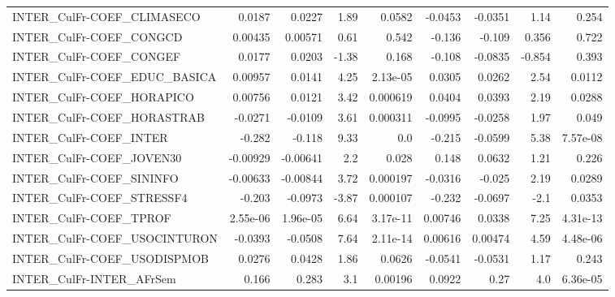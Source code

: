 \begin{tabular}{lrrrrrrrr}
INTER\_CulFr-COEF\_CLIMASECO            &      0.0187 &       0.0227 &    1.89 &   0.0582 &    -0.0453 &     -0.0351 &         1.14 &         0.254 \\
INTER\_CulFr-COEF\_CONGCD               &     0.00435 &      0.00571 &    0.61 &    0.542 &     -0.136 &      -0.109 &        0.356 &         0.722 \\
INTER\_CulFr-COEF\_CONGEF               &      0.0177 &       0.0203 &   -1.38 &    0.168 &     -0.108 &     -0.0835 &       -0.854 &         0.393 \\
INTER\_CulFr-COEF\_EDUC\_BASICA          &     0.00957 &       0.0141 &    4.25 & 2.13e-05 &     0.0305 &      0.0262 &         2.54 &        0.0112 \\
INTER\_CulFr-COEF\_HORAPICO             &     0.00756 &       0.0121 &    3.42 & 0.000619 &     0.0404 &      0.0393 &         2.19 &        0.0288 \\
INTER\_CulFr-COEF\_HORASTRAB            &     -0.0271 &      -0.0109 &    3.61 & 0.000311 &    -0.0995 &     -0.0258 &         1.97 &         0.049 \\
INTER\_CulFr-COEF\_INTER                &      -0.282 &       -0.118 &    9.33 &      0.0 &     -0.215 &     -0.0599 &         5.38 &      7.57e-08 \\
INTER\_CulFr-COEF\_JOVEN30              &    -0.00929 &     -0.00641 &     2.2 &    0.028 &      0.148 &      0.0632 &         1.21 &         0.226 \\
INTER\_CulFr-COEF\_SININFO              &    -0.00633 &     -0.00844 &    3.72 & 0.000197 &    -0.0316 &      -0.025 &         2.19 &        0.0289 \\
INTER\_CulFr-COEF\_STRESSF4             &      -0.203 &      -0.0973 &   -3.87 & 0.000107 &     -0.232 &     -0.0697 &         -2.1 &        0.0353 \\
INTER\_CulFr-COEF\_TPROF                &    2.55e-06 &     1.96e-05 &    6.64 & 3.17e-11 &    0.00746 &      0.0338 &         7.25 &      4.31e-13 \\
INTER\_CulFr-COEF\_USOCINTURON          &     -0.0393 &      -0.0508 &    7.64 & 2.11e-14 &    0.00616 &     0.00474 &         4.59 &      4.48e-06 \\
INTER\_CulFr-COEF\_USODISPMOB           &      0.0276 &       0.0428 &    1.86 &   0.0626 &    -0.0541 &     -0.0531 &         1.17 &         0.243 \\
INTER\_CulFr-INTER\_AFrSem              &       0.166 &        0.283 &     3.1 &  0.00196 &     0.0922 &        0.27 &          4.0 &      6.36e-05 \\

\end{tabular}
